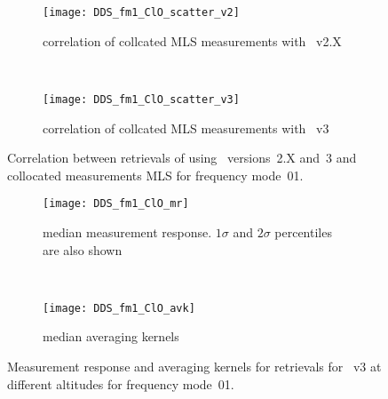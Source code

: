 \begin{figure}[tbhp]
    \centering
    \begin{subfigure}[b]{0.49\textwidth}
        \texttt{[image: DDS\_fm1\_ClO\_scatter\_v2]}
        \caption{correlation of collcated MLS measurements with \smr~v2.X}
        \label{fig:fm01:ClO:scatter:v2}
    \end{subfigure}
    \,
    \begin{subfigure}[b]{0.49\textwidth}
        \texttt{[image: DDS\_fm1\_ClO\_scatter\_v3]}
        \caption{correlation of collcated MLS measurements with \smr~v3}
        \label{fig:fm01:ClO:scatter:v3}
    \end{subfigure}
    \caption{Correlation between retrievals of  using \smr\
    versions~2.X and~3 and collocated measurements MLS for frequency mode~01.}
    \label{fig:fm01:ClO:scatter}
\end{figure}

\begin{figure}[tbhp]
    \centering
    \begin{subfigure}[b]{0.49\textwidth}
        \texttt{[image: DDS\_fm1\_ClO\_mr]}
        \caption{median measurement response.  $1\sigma$ and $2\sigma$
        percentiles are also shown}
        \label{fig:fm01:ClO:mr}
    \end{subfigure}
    \,
    \begin{subfigure}[b]{0.49\textwidth}
        \texttt{[image: DDS\_fm1\_ClO\_avk]}
        \caption{median averaging kernels\newline~}
        \label{fig:fm01:ClO:avk}
    \end{subfigure}
    \caption{Measurement response and averaging kernels for 
    retrievals for \smr~v3 at different altitudes for frequency mode~01.}
    \label{fig:fm01:ClO:mr_avk}
\end{figure}


